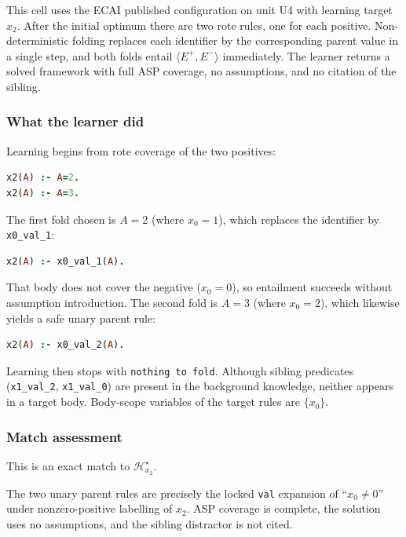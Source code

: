 \documentclass[11pt]{article}
\begin{document}
This cell uses the ECAI published configuration on unit U4 with learning target \(x_2\). After the initial optimum there are two rote rules, one for each positive. Non-deterministic folding replaces each identifier by the corresponding parent value in a single step, and both folds entail \(\langle E^+,E^-\rangle\) immediately. The learner returns a solved framework with full ASP coverage, no assumptions, and no citation of the sibling.

\subsubsection{What the learner did}

Learning begins from rote coverage of the two positives:

\begin{lstlisting}[style=logic,language=Prolog]
x2(A) :- A=2.
x2(A) :- A=3.
\end{lstlisting}

The first fold chosen is \(A=2\) (where \(x_0=1\)), which replaces the identifier by \texttt{x0\_val\_1}:

\begin{lstlisting}[style=logic,language=Prolog]
x2(A) :- x0_val_1(A).
\end{lstlisting}

That body does not cover the negative (\(x_0=0\)), so entailment succeeds without assumption introduction. The second fold is \(A=3\) (where \(x_0=2\)), which likewise yields a safe unary parent rule:

\begin{lstlisting}[style=logic,language=Prolog]
x2(A) :- x0_val_2(A).
\end{lstlisting}

Learning then stops with \texttt{nothing to fold}. Although sibling predicates (\texttt{x1\_val\_2}, \texttt{x1\_val\_0}) are present in the background knowledge, neither appears in a target body. Body-scope variables of the target rules are \(\{x_0\}\).

\subsubsection{Match assessment}

This is an exact match to \(\mathcal{H}_{x_2}^\star\).

The two unary parent rules are precisely the locked \texttt{val} expansion of ``\(x_0\neq 0\)'' under nonzero-positive labelling of \(x_2\). ASP coverage is complete, the solution uses no assumptions, and the sibling distractor is not cited.
\end{document}
